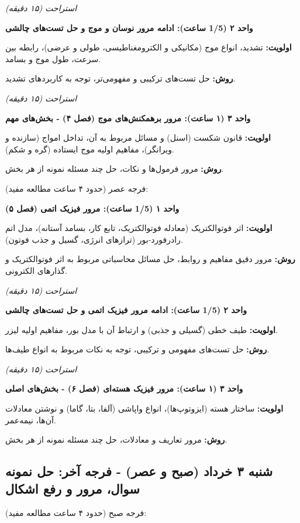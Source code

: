 \documentclass[12pt]{article}
\newcommand{\unithead}[1]{\par\vspace{1ex}\noindent\textbf{#1}\par\nopagebreak[4]\vspace{0.5ex}}
\newcommand{\休息}[1]{\par\centering\textit{#1}\par\vspace{1ex}} %
\begin{document}
\休息{استراحت (۱۵ دقیقه)}

\unithead{واحد ۲ (1/5 ساعت): ادامه مرور نوسان و موج و حل تست‌های چالشی}
\noindent\textbf{اولویت: }تشدید، انواع موج (مکانیکی و الکترومغناطیسی، طولی و عرضی)، رابطه بین سرعت، طول موج و بسامد.
\par\noindent\textbf{روش: }حل تست‌های ترکیبی و مفهومی‌تر، توجه به کاربردهای تشدید.

\休息{استراحت (۱۵ دقیقه)}

\unithead{واحد ۳ (۱ ساعت): مرور برهمکنش‌های موج (فصل ۴) - بخش‌های مهم}
\noindent\textbf{اولویت: }قانون شکست (اسنل) و مسائل مربوط به آن، تداخل امواج (سازنده و ویرانگر)، مفاهیم اولیه موج ایستاده (گره و شکم).
\par\noindent\textbf{روش: }مرور فرمول‌ها و نکات، حل چند مسئله نمونه از هر بخش.

\vspace{1em} %
فرجه عصر (حدود ۴ ساعت مطالعه مفید):

\unithead{واحد ۱ (1/5 ساعت): مرور فیزیک اتمی (فصل ۵)}
\noindent\textbf{اولویت: }اثر فوتوالکتریک (معادله فوتوالکتریک، تابع کار، بسامد آستانه)، مدل اتم رادرفورد-بور (ترازهای انرژی، گسیل و جذب فوتون).
\par\noindent\textbf{روش: }مرور دقیق مفاهیم و روابط، حل مسائل محاسباتی مربوط به اثر فوتوالکتریک و گذارهای الکترونی.

\休息{استراحت (۱۵ دقیقه)}

\unithead{واحد ۲ (1/5 ساعت): ادامه مرور فیزیک اتمی و حل تست‌های چالشی}
\noindent\textbf{اولویت: }طیف خطی (گسیلی و جذبی) و ارتباط آن با مدل بور، مفاهیم اولیه لیزر.
\par\noindent\textbf{روش: }حل تست‌های مفهومی و ترکیبی، توجه به نکات مربوط به انواع طیف‌ها.

\休息{استراحت (۱۵ دقیقه)}

\unithead{واحد ۳ (۱ ساعت): مرور فیزیک هسته‌ای (فصل ۶) - بخش‌های اصلی}
\noindent\textbf{اولویت: }ساختار هسته (ایزوتوپ‌ها)، انواع واپاشی (آلفا، بتا، گاما) و نوشتن معادلات آن‌ها، نیمه‌عمر.
\par\noindent\textbf{روش: }مرور تعاریف و معادلات، حل چند مسئله نمونه از هر بخش.

\subsection*{شنبه ۳ خرداد (صبح و عصر) - فرجه آخر: حل نمونه سوال، مرور و رفع اشکال}
فرجه صبح (حدود ۴ ساعت مطالعه مفید):
\end{document}
